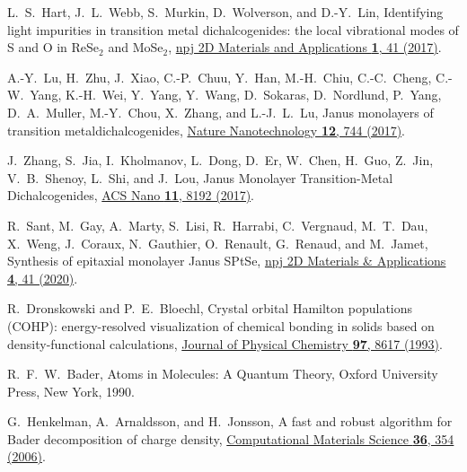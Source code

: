 \documentclass[superscriptaddress, amsmath,amssymb, preprint]{revtex4-2}
\begin{document}
\begin{thebibliography}{116}

 L.~S.~Hart, J.~L.~Webb, S.~Murkin, D.~Wolverson, and D.-Y.~Lin, Identifying light impurities in transition metal dichalcogenides: the local vibrational modes of S and O in ReSe$_{2}$ and MoSe$_{2}$, \href{https://dx.doi.org/10.1038/s41699-017-0043-1}{npj 2D Materials and Applications {\bf 1}, 41 (2017)}.

 A.-Y.~Lu, H.~Zhu, J.~Xiao, C.-P.~Chuu, Y.~Han, M.-H.~Chiu, C.-C.~Cheng, C.-W.~Yang, K.-H.~Wei, Y.~Yang, Y.~Wang, D.~Sokaras, D.~Nordlund, P.~Yang, D.~A.~Muller, M.-Y.~Chou, X.~Zhang, and L.-J.~L.~Lu, Janus monolayers of transition metaldichalcogenides, \href{https://dx.doi.org/10.1038/nnano.2017.100}{Nature Nanotechnology {\bf 12}, 744 (2017)}.

 J.~Zhang, S.~Jia, I.~Kholmanov, L.~Dong, D.~Er, W.~Chen, H.~Guo, Z.~Jin, V.~B.~Shenoy, L.~Shi, and J.~Lou, Janus Monolayer Transition-Metal Dichalcogenides, \href{https://dx.doi.org/10.1021/acsnano.7b03186}{ACS Nano {\bf 11}, 8192 (2017)}.

 R.~Sant, M.~Gay, A.~Marty, S.~Lisi, R.~Harrabi, C.~Vergnaud, M.~T.~Dau, X.~Weng, J.~Coraux, N.~Gauthier, O.~Renault, G.~Renaud, and M.~Jamet, Synthesis of epitaxial monolayer Janus SPtSe, \href{https://doi.org/10.1038/s41699-020-00175-z}{npj 2D Materials \& Applications {\bf 4}, 41 (2020)}.

 R.~Dronskowski and P.~E.~Bloechl, Crystal orbital Hamilton populations (COHP): energy-resolved visualization of chemical bonding in solids based on density-functional calculations, \href{https://doi.org/10.1021/j100135a014}{Journal of Physical Chemistry {\bf 97}, 8617 (1993)}.


 R.~F.~W.~Bader, Atoms in Molecules: A Quantum Theory, Oxford University Press, New York, 1990.

 G.~Henkelman, A.~Arnaldsson, and H.~Jonsson, A fast and robust algorithm for Bader decomposition of charge density, \href{https://doi.org/10.1016/j.commatsci.2005.04.010}{Computational Materials Science {\bf 36}, 354 (2006)}.







\end{thebibliography}
\end{document}

